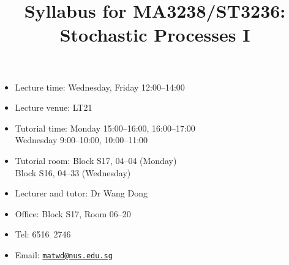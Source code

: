 \documentclass[a4paper]{article}
\title{Syllabus for MA3238/ST3236: Stochastic Processes I}
\date{}
\begin{document}
\maketitle

\begin{minipage}[t]{0.5\linewidth}
  \begin{itemize}[leftmargin=*]
  \item Lecture time: Wednesday, Friday 12:00--14:00
  \item Lecture venue: LT21
  \item Tutorial time: Monday 15:00--16:00, 16:00--17:00 \\
    \phantom{Tutorial time: }Wednesday 9:00--10:00, 10:00--11:00
  \item Tutorial room: Block S17, 04--04 (Monday) \\
    \phantom{Tutorial room: }Block S16, 04--33 (Wednesday)
  \end{itemize}
\end{minipage}
\begin{minipage}[t]{0.4\linewidth}
  \begin{itemize}
  \item Lecturer and tutor: Dr Wang Dong
  \item Office: Block S17, Room 06--20
  \item Tel: 6516\ 2746
  \item Email: \href{mailto:matwd@nus.edu.sg}{\nolinkurl{matwd@nus.edu.sg}}
  \end{itemize}
\end{minipage}
\end{document}
